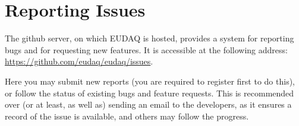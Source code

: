\section{Reporting Issues}
The github server, on which EUDAQ is hosted, provides a system for reporting bugs
and for requesting new features.
It is accessible at the following address:
\url{https://github.com/eudaq/eudaq/issues}.

Here you may submit new reports (you are required to register first to do this),
or follow the status of existing bugs and feature requests.
This is recommended over (or at least, as well as) sending an email to the developers,
as it ensures a record of the issue is available, and others may follow the progress.
